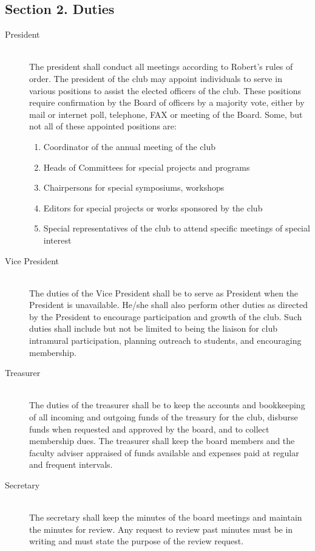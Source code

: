 \documentclass{article}
\begin{document}
  \subsection{Section 2. Duties}
    \begin{description}
      \item[President] ~\\
        The president shall conduct all meetings according to Robert's rules of order. The president of the club may appoint individuals to serve in various positions to assist the elected officers of the club. These positions require confirmation by the Board of officers by a majority vote, either by mail or internet poll, telephone, FAX or meeting of the Board. Some, but not all of these appointed positions are:
        \begin{enumerate}
          \item Coordinator of the annual meeting of the club
          \item Heads of Committees for special projects and programs
          \item Chairpersons for special symposiums, workshops
          \item Editors for special projects or works sponsored by the club
          \item Special representatives of the club to attend specific meetings of special interest
        \end{enumerate}

      \item[Vice President] ~\\
        The duties of the Vice President shall be to serve as President when the President is unavailable. He/she shall also perform other duties as directed by the President to encourage participation and growth of the club. Such duties shall include but not be limited to being the liaison for club intramural participation, planning outreach to students, and encouraging membership.

      \item[Treasurer] ~\\
        The duties of the treasurer shall be to keep the accounts and bookkeeping of all incoming and outgoing funds of the treasury for the club, disburse funds when requested and approved by the board, and to collect membership dues. The treasurer shall keep the board members and the faculty adviser appraised of funds available and expenses paid at regular and frequent intervals.

      \item[Secretary] ~\\
        The secretary shall keep the minutes of the board meetings and maintain the minutes for review. Any request to review past minutes must be in writing and must state the purpose of the review request.
    \end{description}
\end{document}
